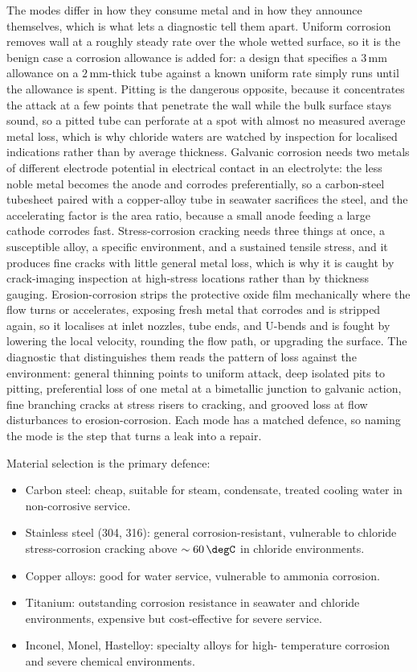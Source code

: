 The modes differ in how they consume metal and in how they announce themselves,
which is what lets a diagnostic tell them apart. Uniform corrosion removes wall at a
roughly steady rate over the whole wetted surface, so it is the benign case a
corrosion allowance is added for: a design that specifies a $3\,\si{\milli\meter}$
allowance on a $2\,\si{\milli\meter}$-thick tube against a known uniform rate simply
runs until the allowance is spent. Pitting is the dangerous opposite, because it
concentrates the attack at a few points that penetrate the wall while the bulk
surface stays sound, so a pitted tube can perforate at a spot with almost no measured
average metal loss, which is why chloride waters are watched by inspection for
localised indications rather than by average thickness. Galvanic corrosion needs
two metals of different electrode potential in electrical contact in an electrolyte:
the less noble metal becomes the anode and corrodes preferentially, so a
carbon-steel tubesheet paired with a copper-alloy tube in seawater sacrifices the
steel, and the accelerating factor is the area ratio, because a small anode feeding
a large cathode corrodes fast. Stress-corrosion cracking needs three things at once,
a susceptible alloy, a specific environment, and a sustained tensile stress, and it
produces fine cracks with little general metal loss, which is why it is caught by
crack-imaging inspection at high-stress locations rather than by thickness gauging.
Erosion-corrosion strips the protective oxide film mechanically where the flow turns
or accelerates, exposing fresh metal that corrodes and is stripped again, so it
localises at inlet nozzles, tube ends, and U-bends and is fought by lowering the
local velocity, rounding the flow path, or upgrading the surface. The diagnostic
that distinguishes them reads the pattern of loss against the environment: general
thinning points to uniform attack, deep isolated pits to pitting, preferential loss
of one metal at a bimetallic junction to galvanic action, fine branching cracks at
stress risers to cracking, and grooved loss at flow disturbances to
erosion-corrosion. Each mode has a matched defence, so naming the mode is the step
that turns a leak into a repair.

Material selection is the primary defence:

\begin{itemize}[leftmargin=*]
  \item Carbon steel: cheap, suitable for steam, condensate, treated
    cooling water in non-corrosive service.
  \item Stainless steel (304, 316): general corrosion-resistant,
    vulnerable to chloride stress-corrosion cracking above $\sim 60\,
    \degC$ in chloride environments.
  \item Copper alloys: good for water service, vulnerable to
    ammonia corrosion.
  \item Titanium: outstanding corrosion resistance in seawater and
    chloride environments, expensive but cost-effective for severe
    service.
  \item Inconel, Monel, Hastelloy: specialty alloys for high-
    temperature corrosion and severe chemical environments.
\end{itemize}

